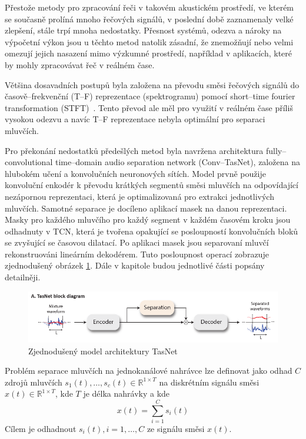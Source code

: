 Přestože metody pro zpracování řeči v takovém akustickém prostředí, ve kterém se současně prolíná mnoho řečových signálů, v poslední době zaznamenaly velké zlepšení, stále trpí mnoha nedostatky. Přesnost systémů, odezva a nároky na výpočetní výkon jsou u těchto metod natolik zásadní, že znemožňují nebo velmi omezují jejich nasazení mimo výzkumné prostředí, například v aplikacích, které by mohly zpracovávat řeč v reálném čase.

Většina dosavadních postupů byla založena na převodu směsi řečových signálů do časově--frekvenční (T--F) reprezentace (spektrogramu) pomocí short--time fourier transformation (STFT)~\cite{speechseparationoverview}. Tento převod ale měl pro využití v reálném čase příliš vysokou odezvu a navíc T--F reprezentace nebyla optimální pro separaci mluvčích.

Pro překonání nedostatků předešlých metod byla navržena architektura fully--convolutional time--domain audio separation network (Conv--TasNet), založena na hlubokém učení a konvolučních neuronových sítích. Model prvně použije konvoluční enkodér k převodu krátkých segmentů směsi mluvčích na odpovídající nezápornou reprezentaci, která je optimalizovaná pro extrakci jednotlivých mluvčích. Samotné separace je docíleno aplikací masek na danou reprezentaci. Masky pro každého mluvčího pro každý segment v každém časovém kroku jsou odhadnuty v TCN, která je tvořena opakující se posloupností konvolučních bloků se zvyšující se časovou dilatací. Po aplikaci masek jsou separovaní mluvčí rekonstruováni lineárním dekodérem. Tuto posloupnost operací zobrazuje zjednodušený obrázek \ref{fig:tasnet-pipe}. Dále v kapitole budou jednotlivé části popsány detailněji.

\begin{figure}[H]
    \centering
    \includegraphics[scale=0.5]{obrazky-figures/tasnet-pipe.png}
    \caption{\label{fig:tasnet-pipe}Zjednodušený model architektury TasNet}
\end{figure}

Problém separace mluvčích na jednokanálové nahrávce lze definovat jako odhad $C$ zdrojů mluvčích $s_1(t), \dots, s_c(t) \in \mathbb{R}^{1 \times T}$ na diskrétním signálu směsi $x(t)\in \mathbb{R}^{1 \times T}$, kde $T$ je délka nahrávky a kde
\begin{equation}
  x(t) = \sum_{i=1}^C s_i(t)
\end{equation}
Cílem je odhadnout $s_i(t), i = 1, \dots, C$ ze signálu směsi $x(t)$.


